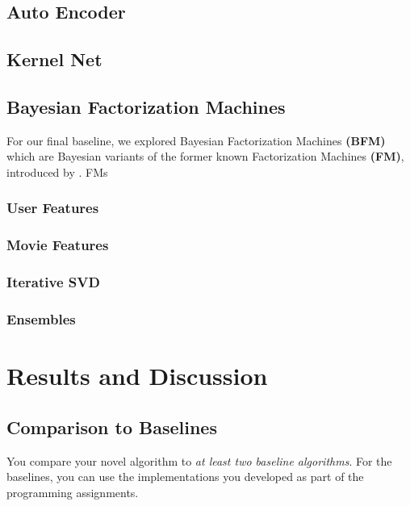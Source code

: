 \documentclass[10pt,conference,compsocconf]{IEEEtran}
\begin{document}
    \subsection{Auto Encoder}

    \subsection{Kernel Net}

    \subsection{Bayesian Factorization Machines}
    For our final baseline, we explored Bayesian Factorization Machines \textbf{(BFM)} which are Bayesian variants of the former known Factorization Machines \textbf{(FM)}, introduced by \citeauthor{rendle_factorization_2010}\cite{rendle_factorization_2010}.
    FMs

    \subsubsection{User Features}
    \cite{lee_improving_2017}

    \subsubsection{Movie Features}

    \subsubsection{Iterative SVD}

    \subsubsection{Ensembles}


    \section{Results and Discussion}

    \subsection{Comparison to Baselines}

    You compare your novel algorithm to \emph{at least two baseline
    algorithms}. For the baselines, you can use the implementations you
    developed as part of the programming assignments.
\end{document}
